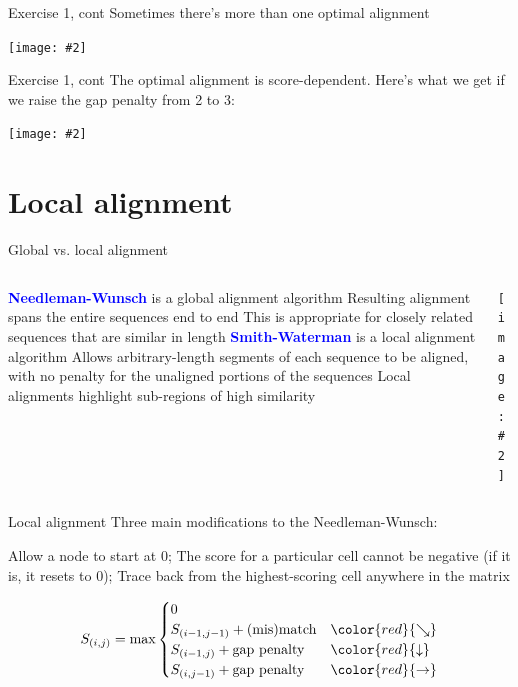 \documentclass{beamer}
\renewcommand{\c}[1]{\begin{center}#1\end{center}}
\newcommand{\blu}[1]{\textcolor{blue}{\textbf{#1}}}
\newcommand{\gr}[2][.95]{\c{\texttt{[image: \#2]}}}
\begin{document}
\begin{frame}{Exercise 1, cont}
Sometimes there's more than one optimal alignment
\gr[0.5]{l3_figs/s42_nw.png}
\end{frame}

\begin{frame}{Exercise 1, cont}
The optimal alignment is score-dependent. Here's what we get if we raise the gap penalty from 2 to 3:
\gr[0.5]{l3_figs/s43_nw.png}
\end{frame}

\section{Local alignment}

\begin{frame}{Global vs. local alignment}
\begin{columns}
\begin{column}{0.6\textwidth}
    \small
    \begin{outline}
    \1[] \blu{Needleman-Wunsch} is a global alignment algorithm
        \2 Resulting alignment spans the entire sequences end to end
        \2 This is appropriate for closely related sequences that are similar in length
    \1[] \blu{Smith-Waterman} is a local alignment algorithm
        \2 Allows arbitrary-length segments of each sequence to be aligned, with no penalty for the unaligned portions of the sequences
        \2 Local alignments highlight sub-regions of high similarity
    \end{outline}
\end{column}
\begin{column}{0.4\textwidth}
\gr{l3_figs/s44_local_align.png}
\end{column}
\end{columns}
\end{frame}

\begin{frame}{Local alignment}
Three main modifications to the Needleman-Wunsch:
\begin{outline}
\1 Allow a node to start at 0;
\1 The score for a particular cell cannot be negative (if it is, it resets to 0);
\1 Trace back from the highest-scoring cell anywhere in the matrix
\end{outline}
\[
S_{(i,j)} = \max\begin{cases}
    0 &\\
    S_{(i-1, j-1)} + \text{(mis)match} &\color{red}{\searrow}\\
    S_{(i-1,j)} + \text{gap penalty} &\color{red}{\downarrow}\\
    S_{(i,j-1)} + \text{gap penalty} &\color{red}{\rightarrow}
\end{cases}
\]
\end{frame}
\end{document}
